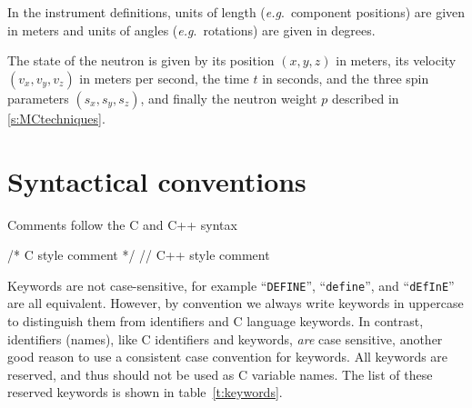 In the instrument definitions, units of length (\textit{e.g}.\ component
positions) are given in meters and units of angles (\textit{e.g}.\
rotations) are given in degrees.

The state of the neutron is given by
its position $(x,y,z)$ in meters, its velocity $(v_x, v_y, v_z)$ in
meters per second, the time $t$ in seconds, and the three spin parameters
$\left( s_x, s_y, s_z \right)$, and finally the neutron weight $p$ described in \ref{s:MCtechniques}.

\section{Syntactical conventions}
\label{s:syntax}

Comments follow the C and C++ syntax

\begin{mcstas}
/* C style comment  */  
// C++ style comment
\end{mcstas}



Keywords are not case-sensitive, for example ``\verb+DEFINE+'',
``\verb+define+'', and ``\verb+dEfInE+'' are all equivalent. However, by
convention we always write keywords in uppercase to distinguish them
from identifiers and C language keywords. In contrast, \MCS
identifiers (names), like C identifiers and keywords, \emph{are} case
sensitive, another good reason to use a consistent case convention for
keywords. All \MCS keywords are reserved, and thus should not be used
as C variable names. The list of these reserved keywords is shown in table~\ref{t:keywords}.

